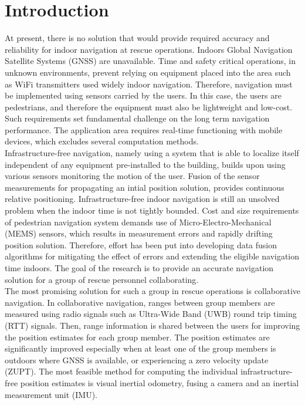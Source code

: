 \setcounter{equation}{0}
\chapter{Introduction}
At present, there is no solution that would provide
required accuracy and reliability for indoor navigation
at rescue operations. Indoors Global Navigation Satellite Systems (GNSS) are unavailable. Time and safety critical operations, in unknown environments, prevent relying on equipment placed into the area such as WiFi transmitters used widely indoor navigation. Therefore, navigation must be implemented using sensors carried by the users. In this case, the users are pedestrians, and therefore the equipment must also be lightweight and low-cost. Such requirements set fundamental challenge on the long term navigation performance. The application area requires real-time functioning with mobile devices,
which excludes several computation methods.
\\
Infrastructure-free navigation, namely using a system that is able to localize itself independent of any equipment pre-installed to the building, builds upon using various sensors monitoring the motion of the user. Fusion of the sensor
measurements for propagating an intial position solution, provides continuous relative positioning. Infrastructure-free indoor navigation is still an unsolved problem when the indoor time is not tightly bounded. Cost and size requirements of pedestrian navigation system demands use of Micro-Electro-Mechanical (MEMS) sensors, which results in measurement errors and rapidly drifting position solution. Therefore, effort has been put into developing data fusion algorithms 
for mitigating the effect of errors and extending the eligible navigation time indoors. The goal of the research is to provide an accurate navigation solution for a group of rescue personnel collaborating.\\
The most promising solution for such a group in rescue operations is collaborative navigation. In collaborative navigation, ranges between group members are measured using radio signals such as Ultra-Wide Band (UWB) round
trip timing (RTT) signals. Then, range information is shared between the users for improving the position estimates for each group member. The position estimates are significantly improved especially when at least one of the group members is outdoors where GNSS is available, or experiencing a zero velocity update (ZUPT). The most feasible method for computing the individual infrastructure-free position estimates is visual inertial odometry, fusing a camera and an inertial measurement unit (IMU).\\
